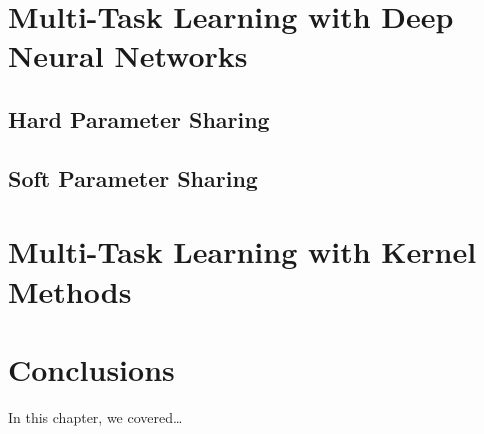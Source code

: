 \section{Multi-Task Learning with Deep Neural Networks}
\subsection{Hard Parameter Sharing}
\subsection{Soft Parameter Sharing}





\section{Multi-Task Learning with Kernel Methods} %








\section{Conclusions}\label{sec-conclusions-2}

In this chapter, we covered\dots
